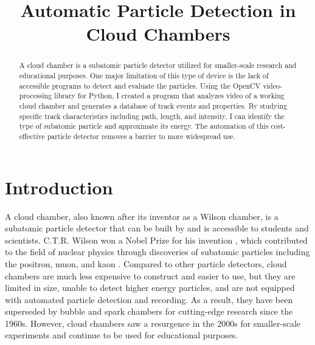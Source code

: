 \documentclass[notitlepage]{article}
\author{}
\title{Automatic Particle Detection in Cloud Chambers}
\date{}
\begin{document}
 




\maketitle

\begin{abstract}
\noindent
A cloud chamber is a subatomic particle detector utilized for smaller-scale research and educational purposes. One major limitation of this type of device is the lack of accessible programs to detect and evaluate the particles. Using the OpenCV video-processing library for Python, I created a program that analyzes video of a working cloud chamber and generates a database of track events and properties. By studying specific track characteristics including path, length, and intensity, I can identify the type of subatomic particle and approximate its energy. The automation of this cost-effective particle detector removes a barrier to more widespread use.
\end{abstract}

\clearpage
\section{Introduction}

A cloud chamber, also known after its inventor as a Wilson chamber, is a subatomic particle detector that can be built by and is accessible to students and scientists.  C.T.R. Wilson won a Nobel Prize for his invention \cite{nobelcloud}, which contributed to the field of nuclear physics through discoveries of subatomic particles including the positron, muon, and kaon \cite{hyperphysics}.  Compared to other particle detectors, cloud chambers are much less expensive to construct and easier to use, but they are limited in size, unable to detect higher energy particles, and are not equipped with automated particle detection and recording.  As a result, they have been superseded by bubble and spark chambers for cutting-edge research since the 1960s. However, cloud chambers saw a resurgence in the 2000s for smaller-scale experiments and continue to be used for educational purposes. 
\end{document}
